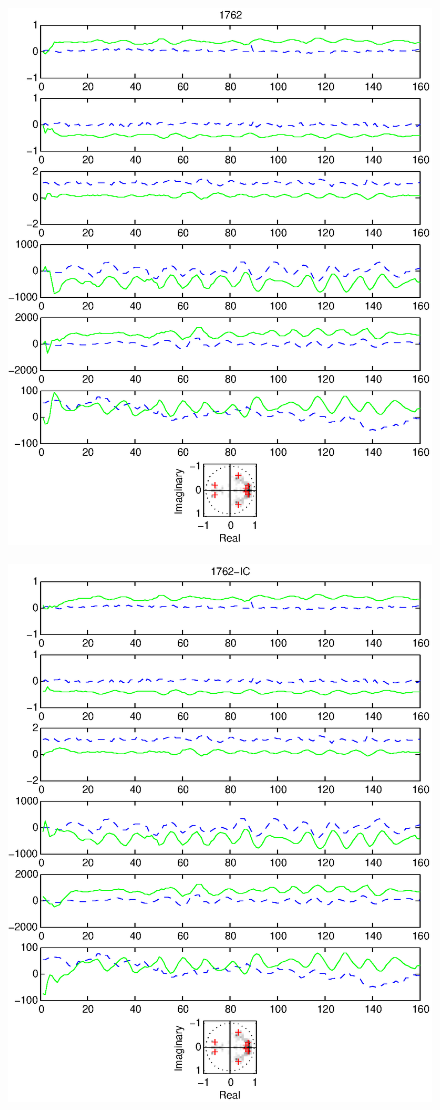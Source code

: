 \documentclass{article}
\begin{document}
\begin{figure}[htb!]
\centering
\includegraphics{1762.eps}
\end{figure}\clearpage
\begin{figure}[htb!]
\centering
\includegraphics{1762_ic.eps}
\end{figure}\clearpage
\end{document}
